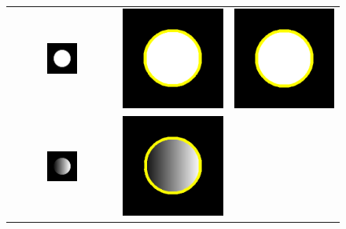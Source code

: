 \begin{figure}[tb]
\centering
\renewcommand{\tabcolsep}{0.05cm}
\begin{tabular}{@{}ccc@{}}
\includegraphics[width=0.3\textwidth]{images/demo/GACvsCV/disk}	&
\includegraphics[height=0.3\textwidth]{images/demo/GACvsCV/GAC_disc}	&
\includegraphics[height=0.3\textwidth]{images/demo/GACvsCV/CV_disc}	\\
\includegraphics[width=0.3\textwidth]{images/demo/GACvsCV/inhom}	&
\includegraphics[height=0.3\textwidth]{images/demo/GACvsCV/GAC_inhom}	&

\end{tabular}
\end{figure}
